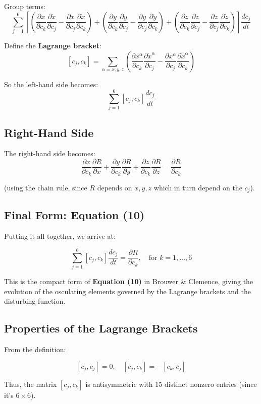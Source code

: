 \documentclass{article}
\begin{document}
Group terms:
\[
\sum_{j=1}^{6}
\left[
\left( \frac{\partial x}{\partial c_k} \frac{\partial \dot{x}}{\partial c_j}
- \frac{\partial x}{\partial c_j} \frac{\partial \dot{x}}{\partial c_k} \right)
+
\left( \frac{\partial y}{\partial c_k} \frac{\partial \dot{y}}{\partial c_j}
- \frac{\partial y}{\partial c_j} \frac{\partial \dot{y}}{\partial c_k} \right)
+
\left( \frac{\partial z}{\partial c_k} \frac{\partial \dot{z}}{\partial c_j}
- \frac{\partial z}{\partial c_j} \frac{\partial \dot{z}}{\partial c_k} \right)
\right]
\frac{dc_j}{dt}
\]

Define the \textbf{Lagrange bracket}:
\[
[c_j, c_k] =
\sum_{\alpha = x, y, z}
\left( \frac{\partial x^\alpha}{\partial c_k} \frac{\partial \dot{x}^\alpha}{\partial c_j}
- \frac{\partial x^\alpha}{\partial c_j} \frac{\partial \dot{x}^\alpha}{\partial c_k} \right)
\]

So the left-hand side becomes:
\[
\sum_{j=1}^{6} [c_j, c_k] \frac{dc_j}{dt}
\]

\subsection*{Right-Hand Side}

The right-hand side becomes:
\[
\frac{\partial x}{\partial c_k} \frac{\partial R}{\partial x}
+ \frac{\partial y}{\partial c_k} \frac{\partial R}{\partial y}
+ \frac{\partial z}{\partial c_k} \frac{\partial R}{\partial z}
= \frac{\partial R}{\partial c_k}
\]

(using the chain rule, since \( R \) depends on \( x, y, z \) which in turn depend on the \( c_j \)).

\subsection*{Final Form: Equation (10)}

Putting it all together, we arrive at:

\[
\sum_{j=1}^{6} [c_j, c_k] \frac{dc_j}{dt} = \frac{\partial R}{\partial c_k}, \quad \text{for } k = 1, \dots, 6
\]

This is the compact form of \textbf{Equation (10)} in Brouwer \& Clemence, giving the evolution of the osculating elements governed by the Lagrange brackets and the disturbing function.

\subsection*{Properties of the Lagrange Brackets}

From the definition:

\[
[c_j, c_j] = 0, \quad
[c_j, c_k] = -[c_k, c_j]
\]

Thus, the matrix \( [c_j, c_k] \) is antisymmetric with 15 distinct nonzero entries (since it's \( 6 \times 6 \)).
\end{document}
